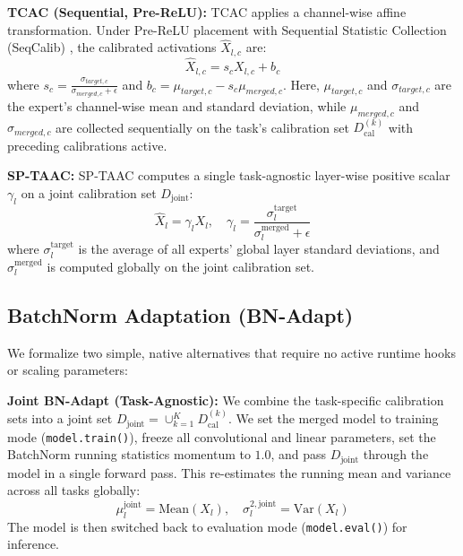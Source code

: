 \documentclass{article}
\begin{document}
\textbf{TCAC (Sequential, Pre-ReLU):} TCAC applies a channel-wise affine transformation. Under Pre-ReLU placement with Sequential Statistic Collection (SeqCalib) \cite{anonymous2026e_decon}, the calibrated activations $\hat{X}_{l,c}$ are:
\begin{equation}
    \hat{X}_{l,c} = s_c X_{l,c} + b_c
\end{equation}
where $s_c = \frac{\sigma_{target,c}}{\sigma_{merged,c} + \epsilon}$ and $b_c = \mu_{target,c} - s_c \mu_{merged,c}$. Here, $\mu_{target,c}$ and $\sigma_{target,c}$ are the expert's channel-wise mean and standard deviation, while $\mu_{merged,c}$ and $\sigma_{merged,c}$ are collected sequentially on the task's calibration set $D^{(k)}_{\text{cal}}$ with preceding calibrations active.

\textbf{SP-TAAC:} SP-TAAC computes a single task-agnostic layer-wise positive scalar $\gamma_l$ on a joint calibration set $D_{\text{joint}}$:
\begin{equation}
    \hat{X}_l = \gamma_l X_l, \quad \gamma_l = \frac{\sigma^{\text{target}}_l}{\sigma^{\text{merged}}_l + \epsilon}
\end{equation}
where $\sigma^{\text{target}}_l$ is the average of all experts' global layer standard deviations, and $\sigma^{\text{merged}}_l$ is computed globally on the joint calibration set.

\subsection{BatchNorm Adaptation (BN-Adapt)}
We formalize two simple, native alternatives that require no active runtime hooks or scaling parameters:

\textbf{Joint BN-Adapt (Task-Agnostic):} We combine the task-specific calibration sets into a joint set $D_{\text{joint}} = \cup_{k=1}^K D^{(k)}_{\text{cal}}$. We set the merged model to training mode (\texttt{model.train()}), freeze all convolutional and linear parameters, set the BatchNorm running statistics momentum to $1.0$, and pass $D_{\text{joint}}$ through the model in a single forward pass. This re-estimates the running mean and variance across all tasks globally:
\begin{equation}
    \mu^{\text{joint}}_l = \text{Mean}(X_l), \quad \sigma^{2,\text{joint}}_l = \text{Var}(X_l)
\end{equation}
The model is then switched back to evaluation mode (\texttt{model.eval()}) for inference.
\end{document}
